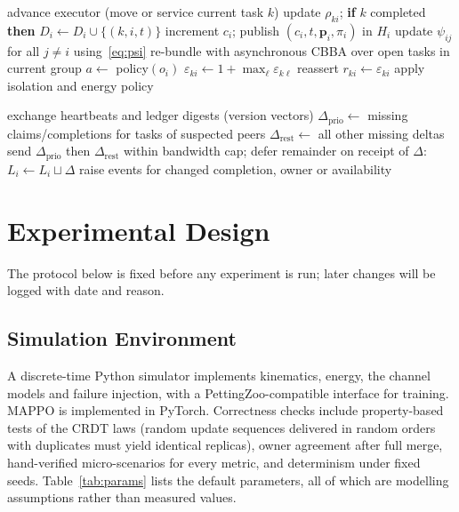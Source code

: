 \documentclass[journal]{IEEEtran}
\newcommand{\rhomin}{\rho_{\min}}
\begin{document}
\begin{algorithm}[!t]
\caption{Per-UAV control loop (UAV $i$, every $\Delta t$)}\label{alg:loop}
\begin{algorithmic}[1]
\State advance executor (move or service current task $k$)
\State update $\rho_{ki}$; \textbf{if} $k$ completed \textbf{then} $D_i\gets D_i\cup\{(k,i,t)\}$
 increment $c_i$; publish $(c_i,t,\mathbf{p}_i,\pi_i)$ in $H_i$ \EndIf
{}  \EndFor
\State update $\psi_{ij}$ for all $j\neq i$ using~\eqref{eq:psi}
 re-bundle with asynchronous CBBA over open tasks in current group \EndIf
{}
  \State $a\gets$ policy$(o_i)$ 
   $\varepsilon_{ki}\gets 1+\max_\ell\varepsilon_{k\ell}$ \EndIf
\EndIf
{}
  \If{$\rho_{ki}\ge\rhomin$ and $\rho_{ki}>\rho_{k,o_i(k)}$} reassert \Else{} $r_{ki}\gets\varepsilon_{ki}$ \EndIf
\EndIf
\State apply isolation and energy policy
\end{algorithmic}
\end{algorithm}

\begin{algorithm}[!t]
\caption{\textsc{SyncExchange}$(i,j)$}\label{alg:sync}
\begin{algorithmic}[1]
\State exchange heartbeats and ledger digests (version vectors)
\State $\Delta_{\mathrm{prio}}\gets$ missing claims/completions for tasks of suspected peers
\State $\Delta_{\mathrm{rest}}\gets$ all other missing deltas
\State send $\Delta_{\mathrm{prio}}$ then $\Delta_{\mathrm{rest}}$ within bandwidth cap; defer remainder
\State on receipt of $\Delta$: $L_i\gets L_i\sqcup\Delta$ 
\State raise events for changed completion, owner or availability
\end{algorithmic}
\end{algorithm}

\section{Experimental Design}\label{sec:experiments}

The protocol below is fixed before any experiment is run; later changes will be logged with date and reason.

\subsection{Simulation Environment}
A discrete-time Python simulator implements kinematics, energy, the channel models and failure injection, with a PettingZoo-compatible interface for training. MAPPO is implemented in PyTorch. Correctness checks include property-based tests of the CRDT laws (random update sequences delivered in random orders with duplicates must yield identical replicas), owner agreement after full merge, hand-verified micro-scenarios for every metric, and determinism under fixed seeds. Table~\ref{tab:params} lists the default parameters, all of which are modelling assumptions rather than measured values.
\end{document}
